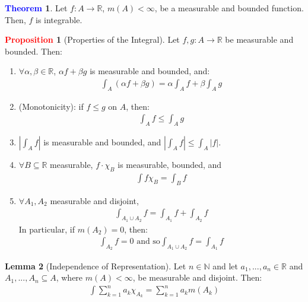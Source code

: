 \documentclass[11pt]{article}
\theoremstyle{definition}
\newcommand{\bb}[1]{\mathbb{#1}}
\newtheorem{theorem}{\textcolor{blue}{Theorem}}
\newtheorem{lemma}[theorem]{Lemma}
\theoremstyle{definition}
\newtheorem{prop}{\textcolor{red}{Proposition}}
\theoremstyle{remark}
\begin{document}
\begin{theorem}
	Let $f: A \rightarrow \bb{R}$, $m(A) < \infty$, be a measurable and bounded function. Then, $f$ is integrable. 
\end{theorem}
\begin{prop}[Properties of the Integral] 
	Let $f, g: A \rightarrow \bb{R}$ be measurable and bounded. Then: 
	\begin{enumerate}[noitemsep]
		\item $\forall \alpha, \beta \in \bb{R}$, $\alpha f + \beta g$ is measurable and bounded, and: 
		\begin{align*}	
			\int_A \left( 	\alpha f + \beta g		\right) 	= \alpha \int_A f + \beta \int_A g 
		\end{align*}
		\item (Monotonicity): if $f \leq g$ on $A$, then: 
		\begin{align*}
			\int_A f \leq \int_A g	
		\end{align*}
	\item $| \int_A f|$ is measurable and bounded, and $| \int_A f | \leq \int_A |f|$. 
	\item $\forall B \subseteq \bb{R}$ measurable, $f \cdot \chi_B$ is measurable, bounded, and 
	\begin{align*}
		\int f \chi_B = \int_B f 	
	\end{align*}
	\item $\forall A_1, A_2$ measurable and disjoint, 
	\begin{align*}
		\int_{A_1 \cup A_2} f = \int_{A_1} f + \int_{A_2} f 	
	\end{align*}
	In particular, if $m(A_2) = 0$, then: 
	\begin{align*}
		\int_{A_2} f = 0 \mbox{ and so} \int_{A_1 \cup A_2}  f = \int_{A_1} f	
	\end{align*}
	\end{enumerate}
\end{prop}

\begin{lemma}[Independence of Representation] 
	Let $n \in \bb{N}$ and let $a_1, ..., a_n \in \bb{R}$ and $A_1, ..., A_n \subseteq A$, where $m(A) < \infty$, be measurable and disjoint. Then: 
	\begin{align*}
		\int \sum_{k=1}^n a_k \chi_{A_k} = \sum_{k=1}^n a_k m(A_k) 	
	\end{align*}

\end{lemma}
\end{document}
